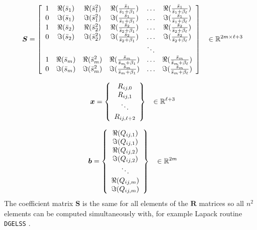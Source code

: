 \documentclass[10pt,openany,twoside]{book}
\numberwithin{equation}{section}   %
\newcommand{\Code}[1]{{\small\tt #1}}
\newcommand{\Matrix}[1]{\boldsymbol{#1}}
\begin{document}
\begin{displaymath}
\Matrix{S} = \left[
\begin{array}{cccccc}
1 & \Re(\bar{s}_1) & \Re(\bar{s}_1^2) & \Re(\frac{\bar{s}_1}{\bar{s}_1 + \beta_1}) & \ldots & \Re(\frac{\bar{s}_1}{\bar{s}_1 + \beta_{\ell}}) \\
0 & \Im(\bar{s}_1) & \Im(\bar{s}_1^2) & \Im(\frac{\bar{s}_1}{\bar{s}_1 + \beta_1}) & \ldots & \Im(\frac{\bar{s}_1}{\bar{s}_1 + \beta_{\ell}}) \\
1 & \Re(\bar{s}_2) & \Re(\bar{s}_2^2) & \Re(\frac{\bar{s}_2}{\bar{s}_2 + \beta_1}) & \ldots & \Re(\frac{\bar{s}_2}{\bar{s}_2 + \beta_{\ell}}) \\
0 & \Im(\bar{s}_2) & \Im(\bar{s}_2^2) & \Im(\frac{\bar{s}_2}{\bar{s}_2 + \beta_1}) & \ldots & \Im(\frac{\bar{s}_2}{\bar{s}_2 + \beta_{\ell}}) \\
  &          &            &                                & \ddots &                           \\
1 & \Re(\bar{s}_m) & \Re(\bar{s}_m^2) & \Re(\frac{\bar{s}_m}{\bar{s}_m + \beta_1}) & \ldots & \Re(\frac{\bar{s}_m}{\bar{s}_m + \beta_{\ell}}) \\
0 & \Im(\bar{s}_m) & \Im(\bar{s}_m^2) & \Im(\frac{\bar{s}_m}{\bar{s}_m + \beta_1}) & \ldots & \Im(\frac{\bar{s}_m}{\bar{s}_m + \beta_{\ell}}) \\
\end{array}
\right]	\hspace{3mm} \in \mathbb{R}^{2m\times \ell+3}
\end{displaymath}

\begin{displaymath}
\Matrix{x} = \left\{
\begin{array}{c}
R_{ij,0} \\
R_{ij,1}  \\
\ddots  \\
R_{ij,\ell+2}
\end{array}
\right\}		\hspace{3mm} \in \mathbb{R}^{\ell+3}
\end{displaymath}

\begin{displaymath}
 \Matrix{b} =
\left\{
\begin{array}{c}
\Re(Q_{ij,1}) \\
\Im(Q_{ij,1}) \\
\Re(Q_{ij,2}) \\
\Im(Q_{ij,2}) \\
\ddots \\
\Re(Q_{ij,m}) \\
\Im(Q_{ij,m})
\end{array}
\right\}		\hspace{3mm} \in \mathbb{R}^{2m}
\end{displaymath}
The coefficient matrix $\Matrix{S}$ is the same for all elements of the
$\Matrix{R}$ matrices so all $n^2$ elements can be computed simultaneously
with, for example Lapack routine \Code{DGELSS} \cite{anderson1999lapack}.
\end{document}

